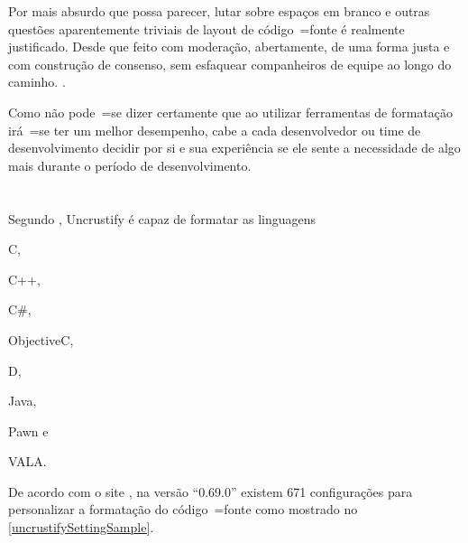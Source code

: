 %
\begin{citacao}
    Por mais absurdo que possa parecer,
    lutar sobre espaços em branco e
    outras questões aparentemente triviais de layout de código~=fonte é realmente justificado.
    Desde que feito com moderação,
    abertamente,
    de uma forma justa e
    com construção de consenso,
    sem esfaquear companheiros de equipe ao longo do caminho.
    \cite[tradução nossa\protect\footnotemark]{deathToTheSpaceInfidels}.
\end{citacao}

Como não pode~=se dizer certamente que ao utilizar ferramentas de formatação irá~=se ter um melhor desempenho,
cabe a cada desenvolvedor ou
time de desenvolvimento decidir por si e
sua experiência se ele sente a necessidade de algo mais durante o período de desenvolvimento.


\section{}
\label{trabalhosRelacionados}

Segundo ,
Uncrustify é capaz de formatar as linguagens
\begin{inparaenum}[1)] \item C,
\item C++,
\item C\#,
\item ObjectiveC,
\item D,
\item Java,
\item Pawn e
\item VALA.
\end{inparaenum}%
De acordo com o site ,
na versão ``0.69.0'' existem 671 configurações para personalizar a formatação do código~=fonte como mostrado no \autoref{uncrustifySettingSample}.

